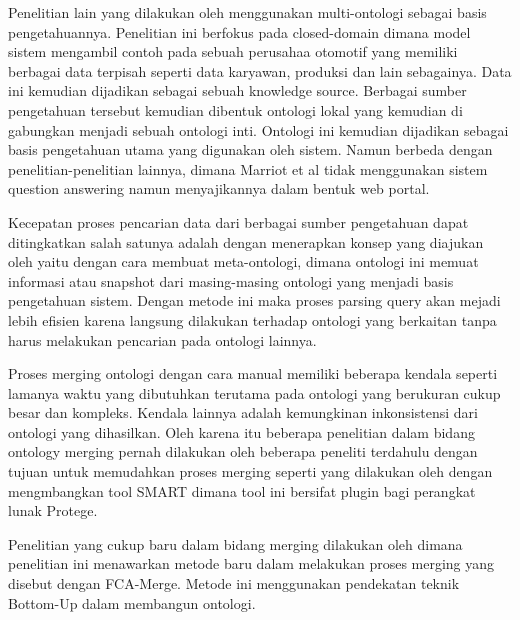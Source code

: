 Penelitian lain yang dilakukan oleh \citet*{marriot} menggunakan multi-ontologi sebagai basis pengetahuannya. Penelitian ini berfokus pada closed-domain dimana model sistem mengambil contoh pada sebuah perusahaa otomotif yang memiliki berbagai data terpisah seperti data karyawan, produksi dan lain sebagainya. Data ini kemudian dijadikan sebagai sebuah knowledge source. Berbagai sumber pengetahuan tersebut kemudian dibentuk ontologi lokal yang kemudian di gabungkan menjadi sebuah ontologi inti. Ontologi ini kemudian dijadikan sebagai basis pengetahuan utama yang digunakan oleh sistem. Namun berbeda dengan penelitian-penelitian lainnya, dimana Marriot et al tidak menggunakan sistem question answering namun menyajikannya dalam bentuk web portal.

Kecepatan proses pencarian data dari berbagai sumber pengetahuan dapat ditingkatkan salah satunya adalah dengan menerapkan konsep yang diajukan oleh \citet*{vargas_motta} yaitu dengan cara membuat meta-ontologi, dimana ontologi ini memuat informasi atau snapshot dari masing-masing ontologi yang menjadi basis pengetahuan sistem. Dengan metode ini maka proses parsing query akan mejadi lebih efisien karena langsung dilakukan terhadap ontologi yang berkaitan tanpa harus melakukan pencarian pada ontologi lainnya.

Proses merging ontologi dengan cara manual memiliki beberapa kendala seperti lamanya waktu yang dibutuhkan terutama pada ontologi yang berukuran cukup besar dan kompleks. Kendala lainnya adalah kemungkinan inkonsistensi dari ontologi yang dihasilkan. Oleh karena itu beberapa penelitian dalam bidang ontology merging pernah dilakukan oleh beberapa peneliti terdahulu dengan tujuan untuk memudahkan proses merging seperti yang dilakukan oleh \citet*{noy_mussen} dengan mengmbangkan tool SMART dimana tool ini bersifat plugin bagi perangkat lunak Protege. 

Penelitian yang cukup baru dalam bidang merging dilakukan oleh \citet*{stumme_maedche} dimana penelitian ini menawarkan metode baru dalam melakukan proses merging yang disebut dengan FCA-Merge. Metode ini menggunakan pendekatan teknik Bottom-Up dalam membangun ontologi.